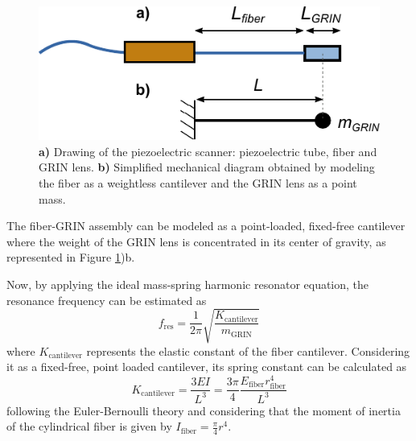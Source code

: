 \begin{figure}[h!]\centering
      \includegraphics{figures/20_Theory/Mechanical/EB.pdf}
      \caption{\textbf{a)} Drawing of the piezoelectric scanner: piezoelectric tube, fiber and GRIN lens. 
      \textbf{b)} Simplified mechanical diagram obtained by modeling the fiber as a weightless cantilever and the GRIN lens as a point mass.}
      \label{fig:EBth}
\end{figure}

The fiber-GRIN assembly can be modeled as a point-loaded, fixed-free cantilever where the weight of the GRIN lens is concentrated in its center of gravity, as represented in Figure \ref{fig:EBth})b. 

Now, by applying the ideal mass-spring harmonic resonator equation, the resonance frequency can be estimated as 
\begin{equation}
f_\mathrm{res} = \frac{1}{2 \pi} \sqrt{\frac{K_\mathrm{cantilever}}{m_{\mathrm{GRIN}}}} 
\label{eq:fres}
\end{equation}
where $K_\mathrm{cantilever}$ represents the elastic constant of the fiber cantilever. Considering it as a fixed-free, point loaded cantilever, its spring constant can be calculated as 
\begin{equation}
K_\mathrm{cantilever} = \frac{3 E I}{L^3} = \frac{3 \pi}{4} \frac{E_\mathrm{fiber} r_\mathrm{fiber}^4}{L^3}
\label{eq:EB}
\end{equation}
following the Euler-Bernoulli theory \cite{MarcJ.Madou2011} and considering that the moment of inertia of the cylindrical fiber is given by $I_\mathrm{fiber} = \frac{\pi}{4} r^4$. 
